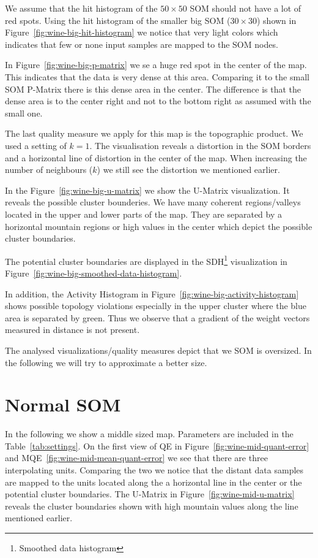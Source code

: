 \documentclass{acm_proc_article-sp}
\begin{document}
We assume that the hit histogram of the $50\times50$ SOM should not have a lot of red spots.
Using the hit histogram of the smaller big SOM ($30\times30$) shown in Figure~\ref{fig:wine-big-hit-histogram} we notice that very light
colors which indicates that few or none input samples are mapped to the SOM nodes.

In Figure~\ref{fig:wine-big-p-matrix} we se a huge red spot in the center of the map. This indicates that
the data is very dense at this area. Comparing it to the small SOM P-Matrix there is this dense area
in the center. The difference is that the dense area is to the center right and not to the bottom right as assumed with
the small one.

The last quality measure we apply for this map is the topographic product.
We used a setting of $k=1$. The visualisation reveals a distortion in the
SOM borders and a horizontal line of distortion in the center of the map.
When increasing the number of neighbours ($k$) we still see the distortion
we mentioned earlier.

In the Figure~\ref{fig:wine-big-u-matrix} we show the U-Matrix visualization.
It reveals the possible cluster bounderies. We have many coherent regions/valleys located in
the upper and lower parts of the map. They are separated by a horizontal mountain regions
or high values in the center which depict the possible cluster boundaries.

The potential cluster boundaries are displayed in the SDH\footnote{Smoothed data histogram} visualization in Figure~\ref{fig:wine-big-smoothed-data-histogram}.

In addition, the Activity Histogram in Figure~\ref{fig:wine-big-activity-histogram} shows possible
topology violations especially in the upper cluster where the blue area is separated by green.
Thus we observe that a gradient of the weight vectors measured in distance is not present. 

The analysed visualizations/quality measures depict that we SOM is oversized.
In the following we will try to approximate a better size.

\section{Normal SOM}

In the following we show a middle sized map. Parameters are included in the Table~\ref{tab:settings}.
On the first view of QE in Figure~\ref{fig:wine-mid-quant-error} and MQE~\ref{fig:wine-mid-mean-quant-error} we see
that there are three interpolating units. Comparing the two we notice that the distant data samples are
mapped to the units located along the a horizontal line in the center or the potential cluster boundaries.
The U-Matrix in Figure~\ref{fig:wine-mid-u-matrix} reveals the cluster boundaries shown with high mountain values
along the line mentioned earlier.
\end{document}

